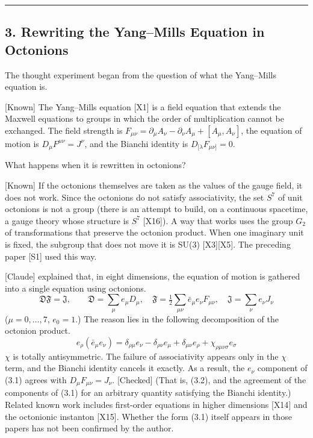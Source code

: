 \documentclass[
  a4paper,
]{article}
\begin{document}
\begin{center}\rule{0.5\linewidth}{0.5pt}\end{center}

\subsection{3. Rewriting the Yang--Mills Equation in
Octonions}\label{rewriting-the-yangmills-equation-in-octonions}

The thought experiment began from the question of what the Yang--Mills
equation is.

{[}Known{]} The Yang--Mills equation {[}X1{]} is a field equation that
extends the Maxwell equations to groups in which the order of
multiplication cannot be exchanged. The field strength is
\(F_{\mu\nu} = \partial_\mu A_\nu - \partial_\nu A_\mu + [A_\mu, A_\nu]\),
the equation of motion is \(D_\mu F^{\mu\nu} = J^\nu\), and the Bianchi
identity is \(D_{[\lambda}F_{\mu\nu]} = 0\).

What happens when it is rewritten in octonions?

{[}Known{]} If the octonions themselves are taken as the values of the
gauge field, it does not work. Since the octonions do not satisfy
associativity, the set \(S^7\) of unit octonions is not a group (there
is an attempt to build, on a continuous spacetime, a gauge theory whose
structure is \(S^7\) {[}X16{]}). A way that works uses the group \(G_2\)
of transformations that preserve the octonion product. When one
imaginary unit is fixed, the subgroup that does not move it is SU(3)
{[}X3{]}{[}X5{]}. The preceding paper {[}S1{]} used this way.

{[}Claude{]} explained that, in eight dimensions, the equation of motion
is gathered into a single equation using octonions. \[
\mathfrak{D}\mathfrak{F} = \mathfrak{J},\qquad \mathfrak{D} = \sum_\mu e_\mu D_\mu,\quad \mathfrak{F} = \tfrac12\sum_{\mu\nu}\bar e_\mu e_\nu F_{\mu\nu},\quad \mathfrak{J} = \sum_\nu e_\nu J_\nu \tag{3.1}
\] (\(\mu = 0, \dots, 7\), \(e_0 = 1\).) The reason lies in the
following decomposition of the octonion product. \[
e_\rho(\bar e_\mu e_\nu) = \delta_{\rho\mu}e_\nu - \delta_{\rho\nu}e_\mu + \delta_{\mu\nu}e_\rho + \chi_{\rho\mu\nu\sigma}e_\sigma \tag{3.2}
\] \(\chi\) is totally antisymmetric. The failure of associativity
appears only in the \(\chi\) term, and the Bianchi identity cancels it
exactly. As a result, the \(e_\nu\) component of (3.1) agrees with
\(D_\mu F_{\mu\nu} = J_\nu\). {[}Checked{]} (That is, (3.2), and the
agreement of the components of (3.1) for an arbitrary quantity
satisfying the Bianchi identity.) Related known work includes
first-order equations in higher dimensions {[}X14{]} and the octonionic
instanton {[}X15{]}. Whether the form (3.1) itself appears in those
papers has not been confirmed by the author.
\end{document}
